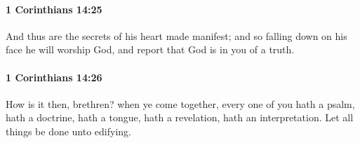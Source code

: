 		\paragraph{1 Corinthians 14:25} %
			\label{1CORINTHIANS-14-25}

			And thus are the secrets of his heart made manifest; and so falling down on his face he will worship God, and report that God is in you of a truth.

			\begin{framed}
				\scriptsize
				\begin{compactdesc}
					\item[SBLG] 
				\end{compactdesc}
			\end{framed}

		\paragraph{1 Corinthians 14:26} %
			\label{1CORINTHIANS-14-26}

			How is it then, brethren?  when ye come together, every one of you hath a psalm, hath a doctrine, hath a tongue, hath a revelation, hath an interpretation.  Let all things be done unto edifying.


